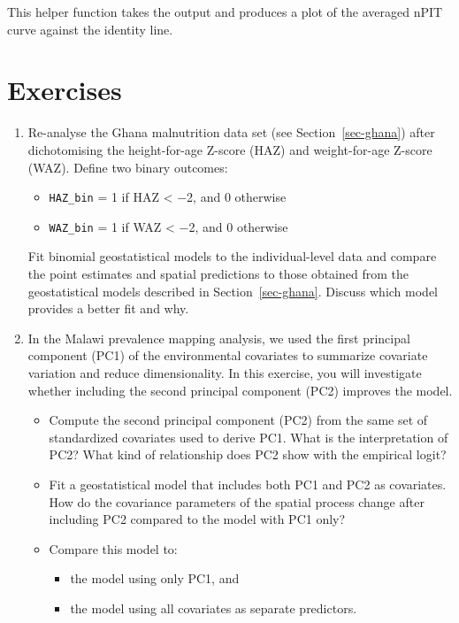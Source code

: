 \documentclass[
  letterpaper,
]{krantz}
\providecommand{\tightlist}{%
  \setlength{\itemsep}{0pt}\setlength{\parskip}{0pt}}
\begin{document}
This helper function takes the output and produces a plot of the
averaged nPIT curve against the identity line.

\section{Exercises}\label{exercises-3}

\begin{enumerate}
\def\labelenumi{\arabic{enumi}.}
\item
  Re-analyse the Ghana malnutrition data set (see
  Section~\ref{sec-ghana}) after dichotomising the height-for-age
  Z-score (HAZ) and weight-for-age Z-score (WAZ). Define two binary
  outcomes:

  \begin{itemize}
  \tightlist
  \item
    \texttt{HAZ\_bin} = 1 if HAZ \textless{} −2, and 0 otherwise\\
  \item
    \texttt{WAZ\_bin} = 1 if WAZ \textless{} −2, and 0 otherwise
  \end{itemize}

  Fit binomial geostatistical models to the individual-level data and
  compare the point estimates and spatial predictions to those obtained
  from the geostatistical models described in Section~\ref{sec-ghana}.
  Discuss which model provides a better fit and why.
\item
  In the Malawi prevalence mapping analysis, we used the first principal
  component (PC1) of the environmental covariates to summarize covariate
  variation and reduce dimensionality. In this exercise, you will
  investigate whether including the second principal component (PC2)
  improves the model.

  \begin{itemize}
  \item
    Compute the second principal component (PC2) from the same set of
    standardized covariates used to derive PC1. What is the
    interpretation of PC2? What kind of relationship does PC2 show with
    the empirical logit?
  \item
    Fit a geostatistical model that includes both PC1 and PC2 as
    covariates. How do the covariance parameters of the spatial process
    change after including PC2 compared to the model with PC1 only?
  \item
    Compare this model to:

    \begin{itemize}
    \tightlist
    \item
      the model using only PC1, and
    \item
      the model using all covariates as separate predictors.
    \end{itemize}


\end{itemize}
\end{enumerate}
\end{document}
